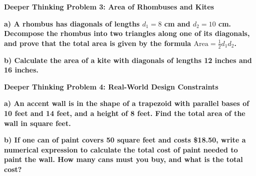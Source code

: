 \documentclass[12pt, letterpaper, fleqn]{article}
\begin{document}
\begin{tcolorbox}[colback=black!5, colframe=black!50, boxrule=1pt, arc=4mm, left=6mm, right=6mm, top=5mm, bottom=5mm]
\textbf{Deeper Thinking Problem 3: Area of Rhombuses and Kites}

\medskip

\noindent
\textbf{a) A rhombus has diagonals of lengths $d_1 = 8$ cm and $d_2 = 10$ cm. Decompose the rhombus into two triangles along one of its diagonals, and prove that the total area is given by the formula $\text{Area} = \frac{1}{2}d_1 d_2$.}

\vspace{3cm}

\noindent
\textbf{b) Calculate the area of a kite with diagonals of lengths 12 inches and 16 inches.}

\vspace{2cm}
\end{tcolorbox}
\newpage

\begin{tcolorbox}[colback=black!5, colframe=black!50, boxrule=1pt, arc=4mm, left=6mm, right=6mm, top=5mm, bottom=5mm]
\textbf{Deeper Thinking Problem 4: Real-World Design Constraints}

\medskip

\noindent
\textbf{a) An accent wall is in the shape of a trapezoid with parallel bases of 10 feet and 14 feet, and a height of 8 feet. Find the total area of the wall in square feet.}

\vspace{2.5cm}

\noindent
\textbf{b) If one can of paint covers 50 square feet and costs \$18.50, write a numerical expression to calculate the total cost of paint needed to paint the wall. How many cans must you buy, and what is the total cost?}

\vspace{2.5cm}
\end{tcolorbox}
\end{document}
